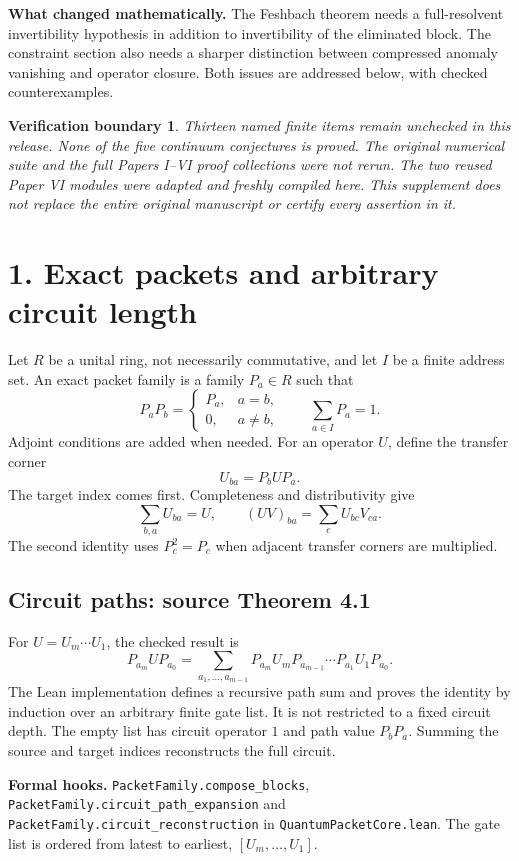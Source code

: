 \documentclass[11pt]{article}
\newcommand{\code}[1]{{\small\nolinkurl{#1}}}
\newtheorem*{scope}{Verification boundary}
\begin{document}
\textbf{What changed mathematically.} The Feshbach theorem needs a full-resolvent invertibility hypothesis in addition to invertibility of the eliminated block. The constraint section also needs a sharper distinction between compressed anomaly vanishing and operator closure. Both issues are addressed below, with checked counterexamples.

\begin{scope}
Thirteen named finite items remain unchecked in this release. None of the five continuum conjectures is proved. The original numerical suite and the full Papers I--VI proof collections were not rerun. The two reused Paper VI modules were adapted and freshly compiled here. This supplement does not replace the entire original manuscript or certify every assertion in it.
\end{scope}

\clearpage
\section*{1. Exact packets and arbitrary circuit length}
Let $R$ be a unital ring, not necessarily commutative, and let $I$ be a finite address set. An exact packet family is a family $P_a\in R$ such that
\[
P_aP_b=\begin{cases}P_a,&a=b,\\0,&a\ne b,\end{cases}
\qquad \sum_{a\in I}P_a=1.
\]
Adjoint conditions are added when needed. For an operator $U$, define the transfer corner
\[
U_{ba}=P_bUP_a.
\]
The target index comes first. Completeness and distributivity give
\[
\sum_{b,a}U_{ba}=U,\qquad
(UV)_{ba}=\sum_c U_{bc}V_{ca}.
\]
The second identity uses $P_c^2=P_c$ when adjacent transfer corners are multiplied.

\subsection*{Circuit paths: source Theorem 4.1}
For $U=U_m\cdots U_1$, the checked result is
\[
P_{a_m}UP_{a_0}
=\sum_{a_1,\ldots,a_{m-1}}
P_{a_m}U_mP_{a_{m-1}}\cdots P_{a_1}U_1P_{a_0}.
\]
The Lean implementation defines a recursive path sum and proves the identity by induction over an arbitrary finite gate list. It is not restricted to a fixed circuit depth. The empty list has circuit operator $1$ and path value $P_bP_a$. Summing the source and target indices reconstructs the full circuit.

\textbf{Formal hooks.} \code{PacketFamily.compose_blocks},
\code{PacketFamily.circuit_path_expansion} and
\code{PacketFamily.circuit_reconstruction} in \code{QuantumPacketCore.lean}.
The gate list is ordered from latest to earliest, $[U_m,\ldots,U_1]$.
\end{document}
